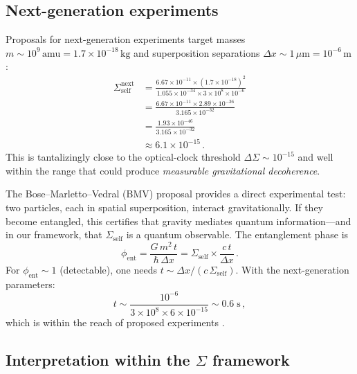 \documentclass[prd,twocolumn,superscriptaddress,longbibliography,floatfix]{revtex4-2}
\newcommand{\DSigma}{\Delta\Sigma}
\begin{document}
\subsection{Next-generation experiments}

Proposals for next-generation experiments target masses
$m \sim 10^9\,\mathrm{amu} = 1.7 \times 10^{-18}\,\mathrm{kg}$
and superposition separations $\Delta x \sim 1\,\mu\mathrm{m}
= 10^{-6}\,\mathrm{m}$ \cite{Bose2017,Marletto2017}:
\begin{align}
  \Sigma_{\mathrm{self}}^{\mathrm{next}} &=
  \frac{6.67 \times 10^{-11} \times (1.7 \times 10^{-18})^2}
  {1.055 \times 10^{-34} \times 3 \times 10^8 \times 10^{-6}}
  \nonumber \\
  &= \frac{6.67 \times 10^{-11} \times 2.89 \times 10^{-36}}
  {3.165 \times 10^{-32}}
  \nonumber \\
  &= \frac{1.93 \times 10^{-46}}{3.165 \times 10^{-32}}
  \nonumber \\
  &\approx 6.1 \times 10^{-15}\,.
  \label{eq:sigma-next}
\end{align}
This is tantalizingly close to the optical-clock threshold
$\DSigma \sim 10^{-15}$ and well within the range that could
produce \emph{measurable gravitational decoherence}.

The Bose--Marletto--Vedral (BMV) proposal \cite{Bose2017,Marletto2017}
provides a direct experimental test: two particles, each in spatial
superposition, interact gravitationally.  If they become entangled,
this certifies that gravity mediates quantum information---and in our
framework, that $\Sigma_{\mathrm{self}}$ is a quantum observable.
The entanglement phase is
\begin{equation}
  \phi_{\mathrm{ent}} = \frac{G\,m^2\,t}{\hbar\,\Delta x}
  = \Sigma_{\mathrm{self}} \times \frac{c\,t}{\Delta x}\,.
  \label{eq:bose-marletto}
\end{equation}
For $\phi_{\mathrm{ent}} \sim 1$ (detectable), one needs
$t \sim \Delta x/(c\,\Sigma_{\mathrm{self}})$.  With the
next-generation parameters:
\begin{equation}
  t \sim \frac{10^{-6}}{3 \times 10^8 \times 6 \times 10^{-15}}
  \sim 0.6\;\mathrm{s}\,,
  \label{eq:bose-marletto-time}
\end{equation}
which is within the reach of proposed experiments
\cite{Bose2017,VanDeKamp2020}.

\subsection{Interpretation within the $\Sigma$ framework}
\end{document}
